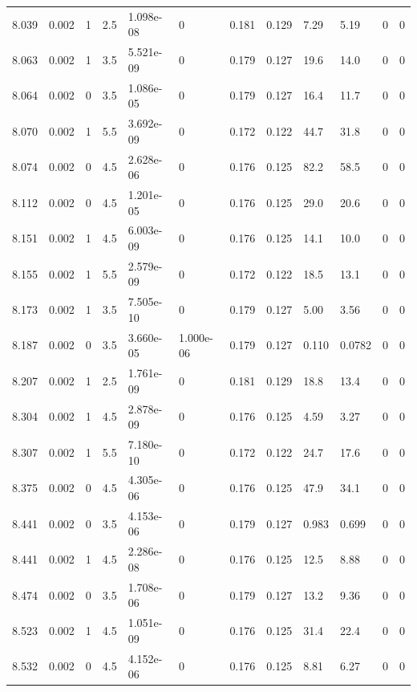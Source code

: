 \documentclass[preview]{standalone}
\begin{document}
{{{{{{{{\begin{tabular}{L{1.2cm}C{1.2cm} C{0.3cm}C{0.5cm} C{1.4cm}C{1.4cm} C{1.4cm}C{1.4cm} C{1.6cm}C{1.6cm} C{1.6cm}C{1.6cm}}
  8.039  &  0.002  & 1     & 2.5 &  1.098e-08  & 0  &  0.181&   0.129& 7.29 & 5.19   &  0 & 0  \\ 
  8.063  &  0.002  & 1     & 3.5 &  5.521e-09  & 0  &  0.179&   0.127& 19.6 & 14.0   &  0 & 0  \\ 
  8.064  &  0.002  & 0     & 3.5 &  1.086e-05  & 0  &  0.179&   0.127& 16.4 & 11.7   &  0 & 0  \\ 
  8.070  &  0.002  & 1     & 5.5 &  3.692e-09  & 0  &  0.172&   0.122& 44.7 & 31.8   &  0 & 0  \\ 
  8.074  &  0.002  & 0     & 4.5 &  2.628e-06  & 0  &  0.176&   0.125& 82.2 & 58.5   &  0 & 0  \\ 
  8.112  &  0.002  & 0     & 4.5 &  1.201e-05  & 0  &  0.176&   0.125& 29.0 & 20.6   &  0 & 0  \\ 
  8.151  &  0.002  & 1     & 4.5 &  6.003e-09  & 0  &  0.176&   0.125& 14.1 & 10.0   &  0 & 0  \\ 
  8.155  &  0.002  & 1     & 5.5 &  2.579e-09  & 0  &  0.172&   0.122& 18.5 & 13.1   &  0 & 0  \\ 
  8.173  &  0.002  & 1     & 3.5 &  7.505e-10  & 0  &  0.179&   0.127& 5.00 & 3.56   &  0 & 0  \\ 
  8.187  &  0.002  & 0     & 3.5 &  3.660e-05  & 1.000e-06  &  0.179&   0.127& 0.110 & 0.0782   &  0 & 0  \\ 
  8.207  &  0.002  & 1     & 2.5 &  1.761e-09  & 0  &  0.181&   0.129& 18.8 & 13.4   &  0 & 0  \\ 
  8.304  &  0.002  & 1     & 4.5 &  2.878e-09  & 0  &  0.176&   0.125& 4.59 & 3.27   &  0 & 0  \\ 
  8.307  &  0.002  & 1     & 5.5 &  7.180e-10  & 0  &  0.172&   0.122& 24.7 & 17.6   &  0 & 0  \\ 
  8.375  &  0.002  & 0     & 4.5 &  4.305e-06  & 0  &  0.176&   0.125& 47.9 & 34.1   &  0 & 0  \\ 
  8.441  &  0.002  & 0     & 3.5 &  4.153e-06  & 0  &  0.179&   0.127& 0.983 & 0.699   &  0 & 0  \\ 
  8.441  &  0.002  & 1     & 4.5 &  2.286e-08  & 0  &  0.176&   0.125& 12.5 & 8.88   &  0 & 0  \\ 
  8.474  &  0.002  & 0     & 3.5 &  1.708e-06  & 0  &  0.179&   0.127& 13.2 & 9.36   &  0 & 0  \\ 
  8.523  &  0.002  & 1     & 4.5 &  1.051e-09  & 0  &  0.176&   0.125& 31.4 & 22.4   &  0 & 0  \\ 
  8.532  &  0.002  & 0     & 4.5 &  4.152e-06  & 0  &  0.176&   0.125& 8.81 & 6.27   &  0 & 0  \\ 

\end{tabular}}}}}}}}}
\end{document}
